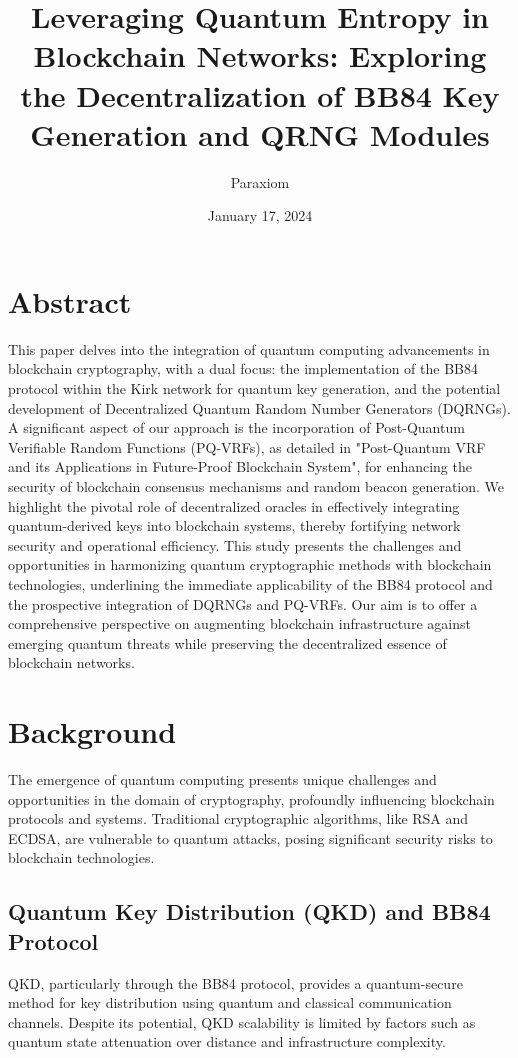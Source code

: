 \documentclass{article}
\title{Leveraging Quantum Entropy in Blockchain Networks: Exploring the Decentralization of BB84 Key Generation and QRNG Modules}
\author{Paraxiom}
\date{January 17, 2024}
\begin{document}
\maketitle

\tableofcontents

\section*{Abstract}
This paper delves into the integration of quantum computing advancements in blockchain cryptography, with a dual focus: the implementation of the BB84 protocol within the Kirk network for quantum key generation, and the potential development of Decentralized Quantum Random Number Generators (DQRNGs). A significant aspect of our approach is the incorporation of Post-Quantum Verifiable Random Functions (PQ-VRFs), as detailed in "Post-Quantum VRF and its Applications in Future-Proof Blockchain System", for enhancing the security of blockchain consensus mechanisms and random beacon generation. We highlight the pivotal role of decentralized oracles in effectively integrating quantum-derived keys into blockchain systems, thereby fortifying network security and operational efficiency. This study presents the challenges and opportunities in harmonizing quantum cryptographic methods with blockchain technologies, underlining the immediate applicability of the BB84 protocol and the prospective integration of DQRNGs and PQ-VRFs. Our aim is to offer a comprehensive perspective on augmenting blockchain infrastructure against emerging quantum threats while preserving the decentralized essence of blockchain networks.

\section{Background}

The emergence of quantum computing presents unique challenges and opportunities in the domain of cryptography, profoundly influencing blockchain protocols and systems. Traditional cryptographic algorithms, like RSA and ECDSA, are vulnerable to quantum attacks, posing significant security risks to blockchain technologies.

\subsection{Quantum Key Distribution (QKD) and BB84 Protocol}
QKD, particularly through the BB84 protocol, provides a quantum-secure method for key distribution using quantum and classical communication channels. Despite its potential, QKD scalability is limited by factors such as quantum state attenuation over distance and infrastructure complexity.
\end{document}
